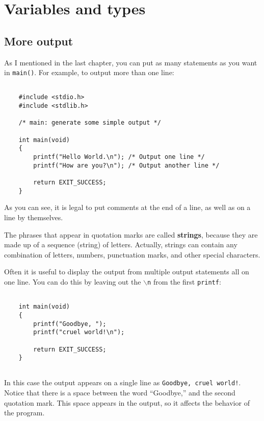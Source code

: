 
\setcounter{chapter}{1}
\chapter{Variables and types}

\section{More output}

As I mentioned in the last chapter, you can put as many statements as
you want in {\tt main()}.  For example, to output more than one line:

\begin{verbatim}

    #include <stdio.h>
    #include <stdlib.h>
  
    /* main: generate some simple output */
  
    int main(void)
    {
        printf("Hello World.\n"); /* Output one line */
        printf("How are you?\n"); /* Output another line */
               
        return EXIT_SUCCESS;
    }

\end{verbatim}
%
As you can see, it is legal to put comments at the
end of a line, as well as on a line by themselves.


The phrases that appear in quotation marks are called {\bf strings},
because they are made up of a sequence (string) of letters.  Actually,
strings can contain any combination of letters, numbers, punctuation
marks, and other special characters.


Often it is useful to display the output from multiple output
statements all on one line.  You can do this by leaving out
the {\tt $\backslash$n} from the first {\tt printf}:

\begin{verbatim}

    int main(void)
    {
        printf("Goodbye, ");
        printf("cruel world!\n");
             
        return EXIT_SUCCESS;
    }
    
\end{verbatim}
%
In this case the output appears on a single line as
{\tt Goodbye, cruel world!}.  Notice that there is a space
between the word ``Goodbye,'' and the second quotation mark.
This space appears in the output, so it affects the behavior
of the program.

